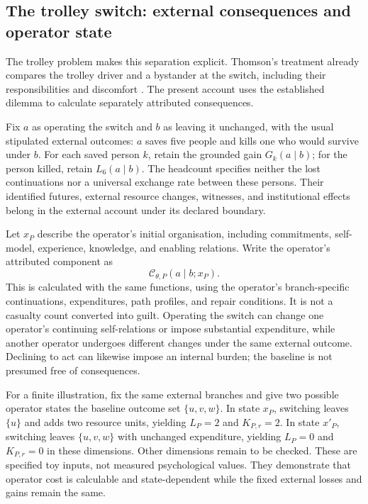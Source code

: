 \documentclass[11pt,a4paper]{article}
\theoremstyle{remark}
\newcommand{\C}{\mathcal C}
\begin{document}
\subsection{The trolley switch: external consequences and operator state}

The trolley problem makes this separation explicit. Thomson's treatment already
compares the trolley driver and a bystander at the switch, including their
responsibilities and discomfort \citep{thomson1985trolley}. The present account
uses the established dilemma to calculate separately attributed consequences.

Fix $a$ as operating the switch and $b$ as leaving it unchanged, with the usual
stipulated external outcomes: $a$ saves five people and kills one who would
survive under $b$. For each saved person $k$, retain the grounded gain
$G_k(a\mid b)$; for the person killed, retain $L_6(a\mid b)$. The headcount
specifies neither the lost continuations nor a universal exchange rate between
these persons. Their identified futures, external resource changes, witnesses,
and institutional effects belong in the external account under its declared
boundary.

Let $x_P$ describe the operator's initial organisation, including commitments,
self-model, experience, knowledge, and enabling relations. Write the operator's
attributed component as
\begin{equation}\label{eq:trolley-operator}
\C_{\theta,P}(a\mid b;x_P).
\end{equation}
This is calculated with the same functions, using the operator's branch-specific
continuations, expenditures, path profiles, and repair conditions. It is not a
casualty count converted into guilt. Operating the switch can change one
operator's continuing self-relations or impose substantial expenditure, while
another operator undergoes different changes under the same external outcome.
Declining to act can likewise impose an internal burden; the baseline is not
presumed free of consequences.

For a finite illustration, fix the same external branches and give two possible
operator states the baseline outcome set $\{u,v,w\}$. In state $x_P$, switching
leaves $\{u\}$ and adds two resource units, yielding $L_P=2$ and $K_{P,r}=2$.
In state $x'_P$, switching leaves $\{u,v,w\}$ with unchanged expenditure,
yielding $L_P=0$ and $K_{P,r}=0$ in these dimensions. Other dimensions remain
to be checked. These are specified toy inputs, not measured psychological
values. They demonstrate that operator cost is calculable and state-dependent
while the fixed external losses and gains remain the same.
\end{document}
